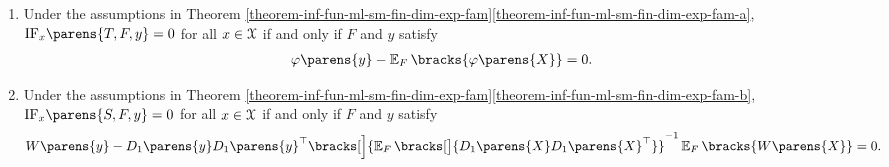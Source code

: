 \begin{corollary}\label{corollary-inffun-fin-dim-exp-fam-zero}
	\leavevmode
	\begin{enumerate}[label=(\alph*)]
		\item \label{corollary-inffun-fin-dim-exp-fam-zero-a} Under the assumptions in Theorem \ref{theorem-inf-fun-ml-sm-fin-dim-exp-fam}\ref{theorem-inf-fun-ml-sm-fin-dim-exp-fam-a}, $\mathrm{IF}_x \parens{T, F, y} = 0$ for all $x \in \mathcal{X}$ if and only if $F$ and $y$ satisfy 
		\begin{align}\label{eq-corollary-inffun-fin-dim-exp-fam-zero-a}
			\varphi \parens{y} - \E_F \bracks{\varphi \parens{X}} = 0. 
		\end{align} 
		
		\item \label{corollary-inffun-fin-dim-exp-fam-zero-b} Under the assumptions in Theorem \ref{theorem-inf-fun-ml-sm-fin-dim-exp-fam}\ref{theorem-inf-fun-ml-sm-fin-dim-exp-fam-b}, $\mathrm{IF}_x \parens{S, F, y} = 0$ for all $x \in \mathcal{X}$ if and only if $F$ and $y$ satisfy 
		\begin{align}\label{eq-corollary-inffun-fin-dim-exp-fam-zero-b}
			W \parens{y} - D_1 \parens{y} D_1 \parens{y}^\top \bracks[\Big]{\E_F \bracks[\big]{D_1 \parens{X} D_1 \parens{X}^\top} }^{-1} \E_F \bracks{W \parens{X}} = 0. 
		\end{align}
	\end{enumerate}
\end{corollary}

